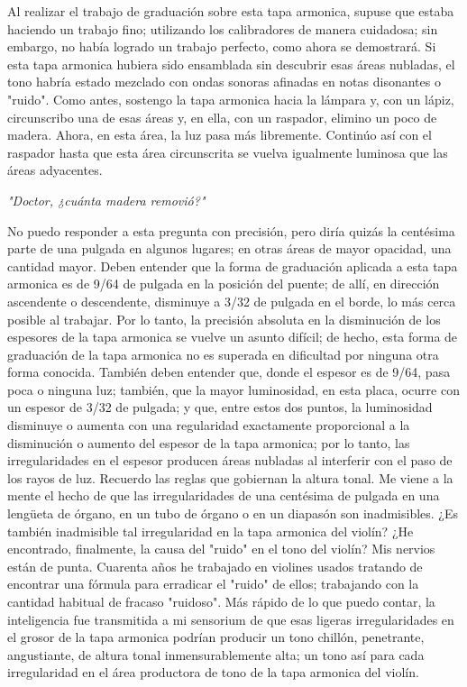 \documentclass[12pt]{book}
\begin{document}
Al realizar el trabajo de graduación sobre esta tapa armonica, supuse que estaba haciendo un trabajo fino; utilizando los calibradores de manera cuidadosa; sin embargo, no había logrado un trabajo perfecto, como ahora se demostrará. Si esta tapa armonica hubiera sido ensamblada sin descubrir esas áreas nubladas, el tono habría estado mezclado con ondas sonoras afinadas en notas disonantes o "ruido". Como antes, sostengo la tapa armonica hacia la lámpara y, con un lápiz, circunscribo una de esas áreas y, en ella, con un raspador, elimino un poco de madera. Ahora, en esta área, la luz pasa más libremente. Continúo así con el raspador hasta que esta área circunscrita se vuelva igualmente luminosa que las áreas adyacentes.

\textit{"Doctor, ¿cuánta madera removió?"}

No puedo responder a esta pregunta con precisión, pero diría quizás la centésima parte de una pulgada en algunos lugares; en otras áreas de mayor opacidad, una cantidad mayor. Deben entender que la forma de graduación aplicada a esta tapa armonica es de 9/64 de pulgada en la posición del puente; de allí, en dirección ascendente o descendente, disminuye a 3/32 de pulgada en el borde, lo más cerca posible al trabajar. Por lo tanto, la precisión absoluta en la disminución de los espesores de la tapa armonica se vuelve un asunto difícil; de hecho, esta forma de graduación de la tapa armonica no es superada en dificultad por ninguna otra forma conocida. También deben entender que, donde el espesor es de 9/64, pasa poca o ninguna luz; también, que la mayor luminosidad, en esta placa, ocurre con un espesor de 3/32 de pulgada; y que, entre estos dos puntos, la luminosidad disminuye o aumenta con una regularidad exactamente proporcional a la disminución o aumento del espesor de la tapa armonica; por lo tanto, las irregularidades en el espesor producen áreas nubladas al interferir con el paso de los rayos de luz. Recuerdo las reglas que gobiernan la altura tonal. Me viene a la mente el hecho de que las irregularidades de una centésima de pulgada en una lengüeta de órgano, en un tubo de órgano o en un diapasón son inadmisibles. ¿Es también inadmisible tal irregularidad en la tapa armonica del violín? ¿He encontrado, finalmente, la causa del "ruido" en el tono del violín? Mis nervios están de punta. Cuarenta años he trabajado en violines usados tratando de encontrar una fórmula para erradicar el "ruido" de ellos; trabajando con la cantidad habitual de fracaso "ruidoso". Más rápido de lo que puedo contar, la inteligencia fue transmitida a mi sensorium de que esas ligeras irregularidades en el grosor de la tapa armonica podrían producir un tono chillón, penetrante, angustiante, de altura tonal inmensurablemente alta; un tono así para cada irregularidad en el área productora de tono de la tapa armonica del violín.
\end{document}
